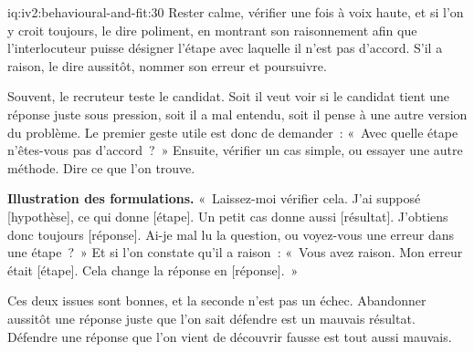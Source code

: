 \begin{solution}{iq:iv2:behavioural-and-fit:30}
Rester calme, vérifier une fois à voix haute, et si l'on y croit toujours, le dire poliment, en montrant son raisonnement afin que l'interlocuteur puisse désigner l'étape avec laquelle il n'est pas d'accord. S'il a raison, le dire aussitôt, nommer son erreur et poursuivre.

Souvent, le recruteur teste le candidat. Soit il veut voir si le candidat tient une réponse juste sous pression, soit il a mal entendu, soit il pense à une autre version du problème. Le premier geste utile est donc de demander~: «~Avec quelle étape n'êtes-vous pas d'accord~?~» Ensuite, vérifier un cas simple, ou essayer une autre méthode. Dire ce que l'on trouve.

\textbf{Illustration des formulations.} «~Laissez-moi vérifier cela. J'ai supposé [hypothèse], ce qui donne [étape]. Un petit cas donne aussi [résultat]. J'obtiens donc toujours [réponse]. Ai-je mal lu la question, ou voyez-vous une erreur dans une étape~?~» Et si l'on constate qu'il a raison~: «~Vous avez raison. Mon erreur était [étape]. Cela change la réponse en [réponse].~»

Ces deux issues sont bonnes, et la seconde n'est pas un échec. Abandonner aussitôt une réponse juste que l'on sait défendre est un mauvais résultat. Défendre une réponse que l'on vient de découvrir fausse est tout aussi mauvais.

\end{solution}
